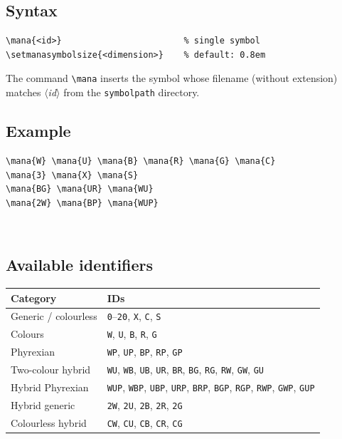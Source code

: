 \documentclass[a4paper,11pt]{article}
\newcommand{\opt}[1]{\texttt{#1}}
\newcommand{\cmd}[1]{\texttt{\textbackslash#1}}
\newcommand{\meta}[1]{\textnormal{\textit{$\langle$#1$\rangle$}}}
\begin{document}
\subsection{Syntax}

\begin{lstlisting}
\mana{<id>}                        % single symbol
\setmanasymbolsize{<dimension>}    % default: 0.8em
\end{lstlisting}

The command \cmd{mana} inserts the symbol whose filename (without extension)
matches \meta{id} from the \opt{symbolpath} directory.

\subsection{Example}

\begin{lstlisting}
\mana{W} \mana{U} \mana{B} \mana{R} \mana{G} \mana{C}
\mana{3} \mana{X} \mana{S}
\mana{BG} \mana{UR} \mana{WU}
\mana{2W} \mana{BP} \mana{WUP}
\end{lstlisting}
\begin{result}
~~~~~~%
~~~%
~~~%
~~
\end{result}

\subsection{Available identifiers}

\begin{center}
\begin{tabular}{@{} l p{8.5cm} @{}}
  \toprule
  \textbf{Category} & \textbf{IDs} \\
  \midrule
  Generic / colourless
    & \texttt{0}--\texttt{20}, \texttt{X}, \texttt{C},
      \texttt{S} \\
  Colours
    & \texttt{W}, \texttt{U}, \texttt{B}, \texttt{R},
      \texttt{G} \\
  Phyrexian
    & \texttt{WP}, \texttt{UP}, \texttt{BP}, \texttt{RP},
      \texttt{GP} \\
  Two-colour hybrid
    & \texttt{WU}, \texttt{WB}, \texttt{UB}, \texttt{UR},
      \texttt{BR}, \texttt{BG}, \texttt{RG}, \texttt{RW},
      \texttt{GW}, \texttt{GU} \\
  Hybrid Phyrexian
    & \texttt{WUP}, \texttt{WBP}, \texttt{UBP},
      \texttt{URP}, \texttt{BRP}, \texttt{BGP},
      \texttt{RGP}, \texttt{RWP}, \texttt{GWP},
      \texttt{GUP} \\
  Hybrid generic
    & \texttt{2W}, \texttt{2U}, \texttt{2B}, \texttt{2R},
      \texttt{2G} \\
  Colourless hybrid
    & \texttt{CW}, \texttt{CU}, \texttt{CB}, \texttt{CR},
      \texttt{CG} \\
  \bottomrule
\end{tabular}
\end{center}
\end{document}
